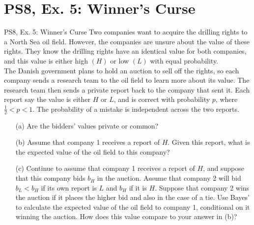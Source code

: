 \section{PS8, Ex. 5: Winner's Curse}

\begin{frame}{PS8, Ex. 5: Winner's Curse}
      Two companies want to acquire the drilling rights to a North Sea oil field. However, the companies are unsure about the value of these rights. They know the drilling rights have an identical value for both companies, and this value is either high $(H)$ or low $(L)$ with equal probability.\\\medskip
      The Danish government plans to hold an auction to sell off the rights, so each company sends a research team to the oil field to learn more about its value. The research team then sends a private report back to the company that sent it. Each report say the value is either $H$ or $L$, and is correct with probability $p$, where $\frac{1}{2} < p < 1$. The probability of a mistake is independent across the two reports.
      \begin{itemize}
        \item[(a)] Are the bidders’ values private or common?
        \item[(b)] Assume that company 1 receives a report of $H$. Given this report, what is the expected value of the oil field to this company?
        \item[(c)] Continue to assume that company 1 receives a report of $H$, and suppose that this company bids $b_H$ in the auction. Assume that company 2 will bid $b_L < b_H$ if its own report is $L$ and $b_H$ if it is $H$. Suppose that company 2 wins the auction if it places the higher bid and also in the case of a tie. Use Bayes’ to calculate the expected value of the oil field to company 1, conditional on it winning the auction. How does this value compare to your answer in (b)?
      \end{itemize}
      \vfill\null
\end{frame}


